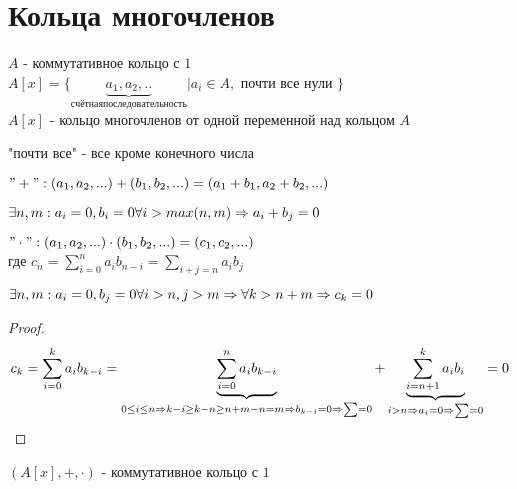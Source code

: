 \section{Кольца многочленов}
	\begin{Def}
		$A$ - коммутативное кольцо с $1$\\
		$A[x] = \lbrace \underbrace{a_1, a_2, .. }_{счётная последовательность} | a_i \in A,$ почти все нули $\rbrace$\\
		$A[x]$ - кольцо многочленов от одной переменной над кольцом $A$\\
	\end{Def}
		 
	\begin{Rem}
		"почти все" - все кроме конечного числа\\
	\end{Rem}
	 
	\begin{Def}	
		$ "+": (a_1, a_2, ...) + (b_1, b_2, ...) = (a_1 + b_1, a_2 + b_2, ...) $\\
	\end{Def}
	
	\begin{Rem}
		$ \exists n, m: a_i = 0, b_i = 0 \forall i > max(n, m) \Rightarrow a_i + b_j = 0 $\\
	\end{Rem}
	 
	\begin{Def}	
		$ "\cdot": (a_1, a_2, ...) \cdot (b_1, b_2, ...) = (c_1, c_2, ...) $\\
		где $ c_n = \sum_{i = 0}^n a_ib_{n - i} = \sum_{i + j = n} a_ib_j $\\
	\end{Def}
		 
	\begin{Rem}
		$ \exists n, m: a_i = 0, b_j = 0 \forall i > n, j > m \Rightarrow \forall k > n + m \Rightarrow c_k = 0 $\\
	\end{Rem}
	
	\begin{proof}
		$$ c_k = \sum_{i = 0}^k a_ib_{k - i} = \underbrace{\sum_{i=0}^n a_ib_{k - i}}_{ 0 \leq i \leq n \Rightarrow
		 k - i \geq k - n \geq n + m - n = m \Rightarrow b_{k - i} = 0 \Rightarrow \sum = 0} +
		 \underbrace{\sum_{i = n + 1}^k a_ib_i}_{i > n \Rightarrow a_i = 0 \Rightarrow \sum = 0} = 0 $$
	\end{proof}	
	
	\begin{theorem}{}
		$(A[x], +, \cdot)$ - коммутативное кольцо с $1$
	\end{theorem}

